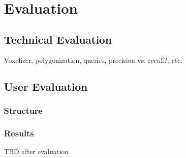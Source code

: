 \chapter{Evaluation}

\section{Technical Evaluation}
Voxelizer, polygonization, queries, precision vs. recall?, etc.

\section{User Evaluation}

\subsection{Structure}

\subsection{Results}

TBD after evaluation